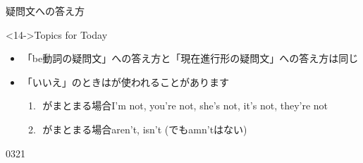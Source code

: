 \documentclass[aspectratio=169,xcolor={dvipsnames,table}]{beamer}
\newcommand{\myaudio}[1]{\href{#1}{\faVolumeUp}}
\begin{document}
\begin{frame}[plain]{疑問文への答え方}
\vspace{15pt}

\begin{block}<14->{Topics for Today\,\,\,}\small

\begin{itemize}[square]
 \item 「be動詞の疑問文」への答え方と「現在進行形の疑問文」への答え方は同じ
 \item 「いいえ」のときはが使われることがあります
         \begin{enumerate}[circle]
	  \item {}\,\,がまとまる場合\hfill{}{\scriptsize I'm not, you're not, she's not, it's not,  they're not}
	  \item {}\,\,がまとまる場合\hfill{}{\scriptsize aren't, isn't\,\,(でもamn'tはない)}
	 \end{enumerate}
\end{itemize}
      \end{block}

\vspace{-15pt}

\mbox{}\hfill{\tiny 0321}\,{\scriptsize \myaudio{./audio/023_is_ing_question_04.mp3}}
\end{frame}
\end{document}
